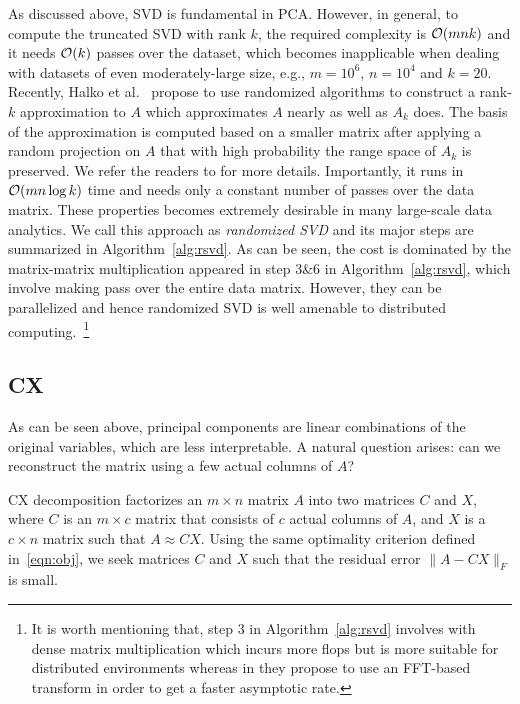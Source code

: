 As discussed above, SVD is fundamental in PCA. However, in general, to compute the truncated SVD with rank $k$, the required complexity is $\operatorname{\mathcal{O}}(mnk)$ and it needs $\operatorname{\mathcal{O}}(k)$ passes over the dataset, which becomes inapplicable when dealing with datasets of even moderately-large size, e.g., $m = 10^6$, $n = 10^4$ and $k = 20$. Recently, Halko et al.~\cite{HMT09_SIREV} propose to use randomized algorithms to construct a rank-$k$ approximation to $A$ which approximates $A$ nearly as well as $A_k$ does.
The basis of the approximation is computed based on a smaller matrix after applying a random projection on $A$ that with high probability the range space of $A_k$ is preserved. We refer the readers to \cite{HMT09_SIREV,Mah-mat-rev_BOOK} for more details.
Importantly, it runs in $\operatorname{\mathcal{O}}(mn \log k)$ time and needs only a constant number of passes over the data matrix. These properties becomes extremely desirable in many large-scale data analytics. We call this approach as {\it randomized SVD} and its major steps are summarized in Algorithm~\ref{alg:rsvd}.
 As can be seen, the cost is dominated by the matrix-matrix multiplication appeared in step 3\&6 in Algorithm~\ref{alg:rsvd}, which involve making pass over the entire data matrix.
However, they can be parallelized and hence randomized SVD is well amenable to distributed computing.~\footnote{It is worth mentioning that, step 3 in Algorithm~\ref{alg:rsvd} involves with dense matrix multiplication which incurs more flops but is more suitable for distributed environments whereas in \cite{HMT09_SIREV} they propose to use an FFT-based transform in order to get a faster asymptotic rate.}

\subsection{CX}
As can be seen above, principal components are linear combinations of the original variables, which are less interpretable. A natural question arises: can we reconstruct the matrix using a few actual columns of $A$?

CX decomposition factorizes an $m \times n$ matrix $A$ into two matrices $C$ and $X$, where $C$ is an $m\times c$ matrix that consists of $c$ actual columns
of $A$, and $X$ is a $c \times n$ matrix such that $A\approx CX$.
Using the same optimality criterion defined in~\eqref{eqn:obj}, we seek matrices $C$ and $X$ such that the residual error $\|A-CX\|_F$ is small.

